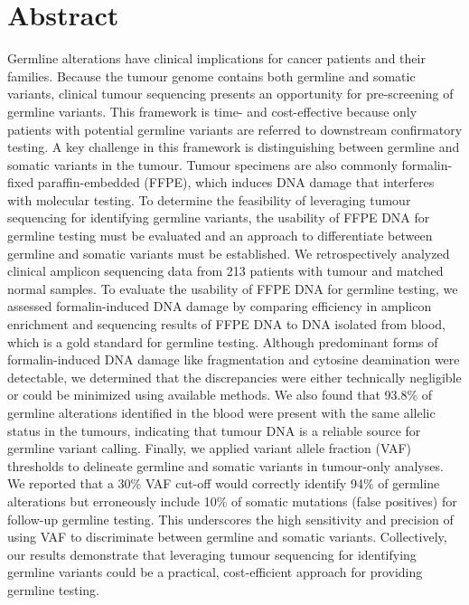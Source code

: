
\chapter{Abstract}

Germline alterations have clinical implications for cancer patients and their families. Because the tumour genome contains both germline and somatic variants, clinical tumour sequencing presents an opportunity for pre-screening of germline variants. This framework is time- and cost-effective because only patients with potential germline variants are referred to downstream confirmatory testing. A key challenge in this framework is distinguishing between germline and somatic variants in the tumour. Tumour specimens are also commonly formalin-fixed paraffin-embedded (FFPE), which induces DNA damage that interferes with molecular testing. To determine the feasibility of leveraging tumour sequencing for identifying germline variants, the usability of FFPE DNA for germline testing must be evaluated and an approach to differentiate between germline and somatic variants must be established. We retrospectively analyzed clinical amplicon sequencing data from 213 patients with tumour and matched normal samples. To evaluate the usability of FFPE DNA for germline testing, we assessed formalin-induced DNA damage by comparing efficiency in amplicon enrichment and sequencing results of FFPE DNA to DNA isolated from blood, which is a gold standard for germline testing. Although predominant forms of formalin-induced DNA damage like fragmentation and cytosine deamination were detectable, we determined that the discrepancies were either technically negligible or could be minimized using available methods. We also found that 93.8\% of germline alterations identified in the blood were present with the same allelic status in the tumours, indicating that tumour DNA is a reliable source for germline variant calling. Finally, we applied variant allele fraction (VAF) thresholds to delineate germline and somatic variants in tumour-only analyses. We reported that a 30\% VAF cut-off would correctly identify 94\% of germline alterations but erroneously include 10\% of somatic mutations (false positives) for follow-up germline testing. This underscores the high sensitivity and precision of using VAF to discriminate between germline and somatic variants. Collectively, our results demonstrate that leveraging tumour sequencing for identifying germline variants could be a practical, cost-efficient approach for providing germline testing.

